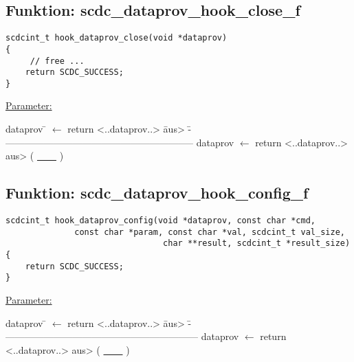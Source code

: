 
\subsection{\textbf{Funktion:} scdc\_dataprov\_hook\_close\_f}\label{scdc_dataprov_hook_close_f}
\begin{lstlisting}[escapechar={~}]
scdcint_t hook_dataprov_close(void *dataprov)
{
	 // free ...
	return SCDC_SUCCESS;
}
\end{lstlisting}

\underline{Parameter:}
\begin{tabbing}
dataprov \= $\leftarrow$ return <..dataprov..> \= aus> \= ------------------------------------------------------------ \kill
dataprov \> $\leftarrow$ return <..dataprov..> \> aus> \> ( \underline{~~~~} )\\
\end{tabbing}


\subsection{\textbf{Funktion:} scdc\_dataprov\_hook\_config\_f}\label{scdc_dataprov_hook_config_f}
\begin{lstlisting}[escapechar={~}]
scdcint_t hook_dataprov_config(void *dataprov, const char *cmd,
              const char *param, const char *val, scdcint_t val_size, 
                                char **result, scdcint_t *result_size)
{
    return SCDC_SUCCESS;
}
\end{lstlisting}

\underline{Parameter:}
\begin{tabbing}
dataprov \= $\leftarrow$ return <..dataprov..> \= aus> \= ------------------------------------------------------------- \kill
dataprov \> $\leftarrow$ return <..dataprov..> \> aus> \> ( \underline{~~~~} )\\
\end{tabbing}



